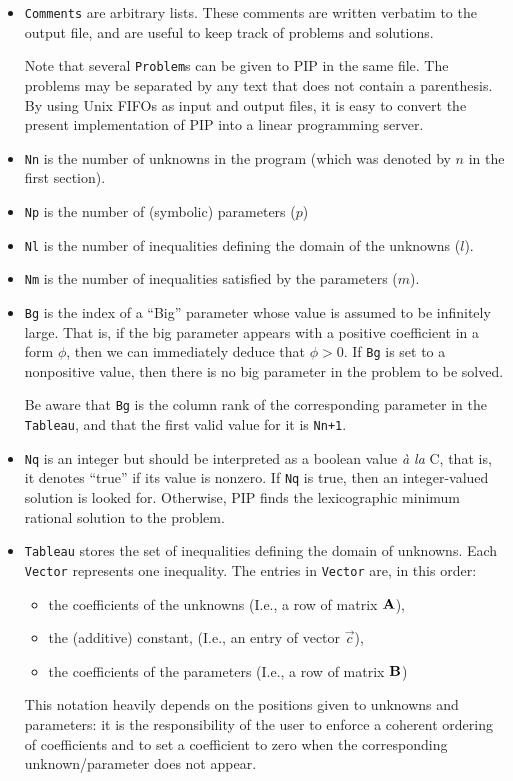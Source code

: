 \documentclass[12pt,a4paper,dvips]{article}
\begin{document}
\begin{itemize}
\item
{\tt Comments} are arbitrary lists. These comments are
written verbatim to the output file, and are useful to keep track of
problems and solutions.

Note that several {\tt Problem}s can be given to PIP in the same
file. The problems may be separated by any text that does not
contain a parenthesis. By using Unix FIFOs as input and output files,
it is easy to convert the present implementation of PIP into a
linear programming server.

\item
{\tt Nn} is the number of unknowns in the program (which was denoted
by $n$ in the first section).

\item {\tt Np} is the number of (symbolic) parameters ($p$)

\item {\tt Nl} is the number of inequalities defining the domain of the unknowns ($l$). 

\item {\tt Nm} is the number of inequalities satisfied by the parameters ($m$).

\item {\tt Bg} is the index of a  ``Big'' parameter whose value is assumed 
to be infinitely large. That is, if the big parameter appears with a
positive coefficient in a form $\phi$, then we can immediately deduce
that $\phi > 0$. If {\tt Bg} is set to a nonpositive
value, then there is no big parameter in the problem to be solved.

Be aware that {\tt Bg} is the column rank of the corresponding
parameter in the {\tt Tableau}, and that the first valid value for it
is {\tt Nn+1}.

\item {\tt Nq} is an integer but should be interpreted
 as a boolean value {\sl \`a la} 
C, that is, it denotes ``true'' if its value is nonzero. If {\tt Nq}
is true, then an integer-valued solution is looked for. Otherwise, PIP
finds the lexicographic minimum rational solution to the problem.

\item {\tt Tableau} stores the set of inequalities defining the domain 
of unknowns. Each {\tt Vector} represents one inequality. The entries
in {\tt Vector} are, in this order:
\begin{itemize}
\item the coefficients of the unknowns (I.e., a row of matrix ${\bf A}$),
\item the (additive) constant, (I.e., an entry of vector $\vec{c}$),
\item the coefficients of the parameters (I.e., a row of matrix ${\bf B}$)
\end{itemize}
This notation heavily depends on the positions given
to unknowns and parameters: it is the responsibility of the user to
enforce a coherent ordering of coefficients and to set a coefficient
to zero when the corresponding unknown/parameter does not appear.


\end{itemize}
\end{document}

